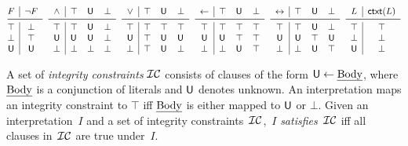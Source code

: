 \documentclass[12pt]{article}
\begin{document}
\begin{table}[t]
\[\small
\begin{array}[c]{@{\hspace{0mm}}c|c}
F & \neg F\\ \midrule
\top & \bot \\
\bot & \top \\
\udf & \udf
\end{array}
\;\
\begin{array}{c|lll}
 \wedge & \top & \udf & \bot \\
\midrule
\top & \top & \udf & \bot \\
\udf & \udf & \udf & \bot \\
\bot & \bot & \bot & \bot
 \end{array}
\;\
\begin{array}{c|lll}
 \vee & \top & \udf & \bot \\
\midrule
\top & \top & \top & \top \\
\udf & \top & \udf & \udf \\
\bot & \top & \udf & \bot
 \end{array}
\;\
\begin{array}{c|lll}
\leftarrow & \top & \udf & \bot \\
\midrule
\top & \top & \top & \top \\
\udf & \udf & \top & \top \\
\bot & \bot & \udf & \top
 \end{array}
\;\
\begin{array}{c|ccc}
  \leftrightarrow  & \top & \udf & \bot \\
  \midrule
\top & \top & \udf & \bot \\
\udf & \udf & \top & \udf\\
\bot & \bot & \udf & \top
 \end{array}
\;\
\begin{array}{c|c}
 L & \cxt(L)\\
\midrule
\top & \top \\
\bot & \bot  \\
\udf & \bot
\end{array}
\]
\caption{The truth tables for the connectives under the three-valued {\L}ukasiewicz logic and for $\cxt$. $L$ is a literal, $\top$, $\bot$, and $\udf$ denote \textit{true}, \textit{false},
and \textit{unknown}, respectively.\label{tab:3vldluka}}
\end{table}

A set of \textit{integrity constraints} ${\cal IC}$ consists of clauses of
the form $\mathsf{U} \leftarrow \mbox{\em Body}$, where $\mbox{\em Body}$ is a conjunction of
literals and $\udf$ denotes unknown. An interpretation maps
an integrity constraint to $\top$ iff $\mbox{\em Body}$ is either mapped to
$\udf$ or $\bot$.  
Given an interpretation~$I$
and a set of integrity constraints~${\cal IC}$,~$I$ \textit{satisfies}~${\cal IC}$
iff all clauses in~${\cal IC}$ are true under~$I$.
\end{document}
